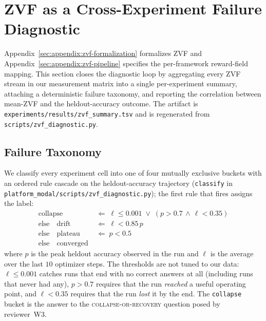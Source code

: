 %
%

\section{ZVF as a Cross-Experiment Failure Diagnostic}
\label{sec:zvf-cross-experiment}

Appendix~\ref{sec:appendix:zvf-formalization} formalizes ZVF and
Appendix~\ref{sec:appendix:zvf-pipeline} specifies the per-framework
reward-field mapping. This section closes the
diagnostic loop by aggregating every ZVF stream in our measurement
matrix into a single per-experiment summary, attaching a deterministic
failure taxonomy, and reporting the correlation between mean-ZVF and
the heldout-accuracy outcome. The artifact is
\texttt{experiments/results/zvf\_summary.tsv} and is regenerated from
\texttt{scripts/zvf\_diagnostic.py}.

\subsection{Failure Taxonomy}

We classify every experiment cell into one of four mutually exclusive
buckets with an ordered rule cascade on the heldout-accuracy trajectory
(\texttt{classify} in \texttt{platform\_modal/scripts/zvf\_diagnostic.py});
the first rule that fires assigns the label:
\begin{align}
\mathrm{collapse} &\;\Leftarrow\; \ell \le 0.001 \;\vee\; (p > 0.7 \,\wedge\, \ell < 0.35) \label{eq:collapse}\\
\text{else}\quad\mathrm{drift} &\;\Leftarrow\; \ell < 0.85\,p \label{eq:drift}\\
\text{else}\quad\mathrm{plateau} &\;\Leftarrow\; p < 0.5 \label{eq:plateau}\\
\text{else}\quad\mathrm{converged} & \label{eq:converged}
\end{align}
where $p$ is the peak heldout accuracy observed in the run and
$\ell$ is the average over the last $10$ optimizer steps. The
thresholds are not tuned to our data: $\ell \le 0.001$ catches runs that end
with no correct answers at all (including runs that never had any),
$p > 0.7$ requires that the run \emph{reached} a useful operating point,
and $\ell < 0.35$ requires that the run \emph{lost} it by the end. The
\texttt{collapse} bucket is the answer to the
\textsc{collapse-or-recovery} question posed by reviewer~W3.

